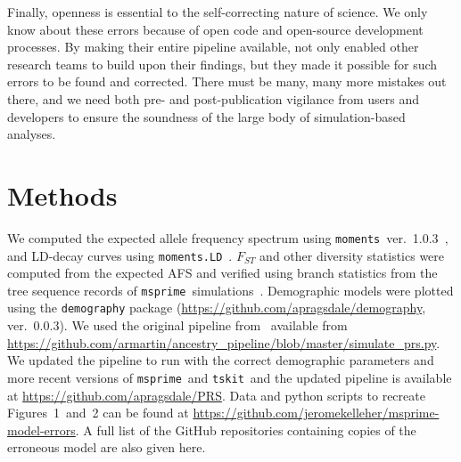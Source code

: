 \documentclass{article}
\newcommand{\msprime}[0]{\texttt{msprime}}
\newcommand{\tskit}[0]{\texttt{tskit}}
\begin{document}
Finally, openness is essential to the self-correcting nature of science.
We only know about these errors because of open code and
open-source development processes. By making their entire pipeline available,
\citet{martin2017human} not only enabled other research teams to build upon their findings,
but they made it possible for such errors to be found and corrected.
There must be many, many more mistakes out there, and we need both
pre- and post-publication vigilance from users and developers to ensure the
soundness of the large body of simulation-based analyses.


\section*{Methods}


We computed the expected allele frequency spectrum using
\texttt{moments}~ver.~1.0.3~\citep{jouganous2017inferring}, and LD-decay curves using
\texttt{moments.LD}~\citep{ragsdale2019models}. $F_{ST}$ and other diversity statistics
were computed from the expected AFS and verified using branch statistics from the
tree sequence records of \msprime\ simulations~\citep{ralph2020efficiently}.
Demographic models were plotted using the \texttt{demography} package
(\url{https://github.com/apragsdale/demography}, ver.~0.0.3).
We used the original pipeline from~\citet{martin2017human} available from
\url{https://github.com/armartin/ancestry_pipeline/blob/master/simulate_prs.py}.
We updated the pipeline to run with the correct demographic parameters and more
recent versions of \msprime\ and \tskit\, and the updated pipeline is
available at \url{https://github.com/apragsdale/PRS}.
Data and python scripts to recreate Figures~1~and~2 can be found at
\url{https://github.com/jeromekelleher/msprime-model-errors}.
A full list of the GitHub repositories containing copies of the erroneous
model are also given here.




\pagebreak
\end{document}
